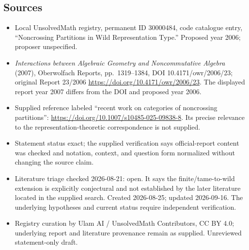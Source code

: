 \documentclass[11pt]{article}
\begin{document}
\subsection{Sources}
\begin{itemize}
\item Local UnsolvedMath registry, permanent ID 30000484, code catalogue entry, ``Noncrossing Partitions in Wild Representation Type.'' Proposed year 2006; proposer unspecified.
\item \emph{Interactions between Algebraic Geometry and Noncommutative Algebra} (2007), Oberwolfach Reports, pp.\ 1319--1384, DOI 10.4171/owr/2006/23; original Report 23/2006 \url{https://doi.org/10.4171/owr/2006/23}. The displayed report year 2007 differs from the DOI and proposed year 2006.
\item Supplied reference labeled ``recent work on categories of noncrossing partitions'': \url{https://doi.org/10.1007/s10485-025-09838-8}. Its precise relevance to the representation-theoretic correspondence is not supplied.
\item Statement status exact; the supplied verification says official-report content was checked and notation, context, and question form normalized without changing the source claim.
\item Literature triage checked 2026-08-21: open. It says the finite/tame-to-wild extension is explicitly conjectural and not established by the later literature located in the supplied search. Created 2026-08-25; updated 2026-09-16. The underlying hypotheses and current status require independent verification.
\item Registry curation by Ulam AI / UnsolvedMath Contributors, CC BY 4.0; underlying report and literature provenance remain as supplied. Unreviewed statement-only draft.
\end{itemize}
\end{document}

